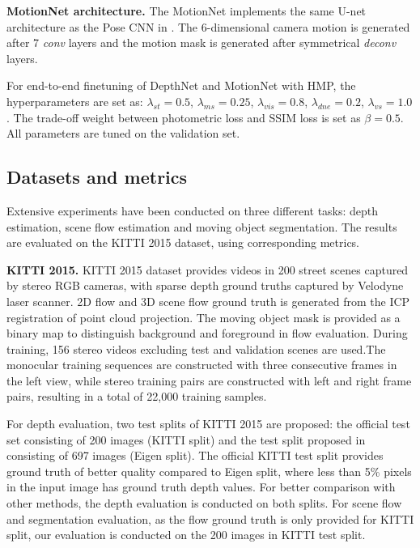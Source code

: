 \documentclass[runningheads]{llncs}
\begin{document}
\vspace{0.5\baselineskip}
\noindent\textbf{MotionNet architecture.}
The MotionNet implements the same U-net \cite{ronneberger2015u} architecture as the Pose CNN in \cite{zhou2017unsupervised}. The 6-dimensional camera motion is generated after 7 \textit{conv} layers and the motion mask is generated after symmetrical \textit{deconv} layers.

For end-to-end finetuning of DepthNet and MotionNet with HMP, the hyperparameters are set as: $\lambda_{st} = 0.5$, $\lambda_{ms} = 0.25$, $\lambda_{vis} = 0.8$, $\lambda_{dne} = 0.2$, $\lambda_{vs} = 1.0$. The trade-off weight between photometric loss and SSIM loss is set as $\beta=0.5$. All parameters are tuned on the validation set.


\vspace{-0.3\baselineskip}
\subsection{Datasets and metrics}
\vspace{-0.3\baselineskip}

Extensive experiments have been conducted on three different tasks: depth estimation, scene flow estimation and moving object segmentation. The results are evaluated on the KITTI 2015 dataset, using corresponding metrics.

\vspace{0.5\baselineskip}
\noindent\textbf{KITTI 2015.}
KITTI 2015 dataset provides videos in 200 street scenes captured by stereo RGB cameras, with sparse depth ground truths captured by Velodyne laser scanner. 2D flow and 3D scene flow ground truth is generated from the ICP registration of point cloud projection. The moving object mask is provided as a binary map to distinguish background and foreground in flow evaluation. During training, 156 stereo videos excluding test and validation scenes are used.The monocular training sequences are constructed with three consecutive frames in the left view, while stereo training pairs are constructed with left and right frame pairs, resulting in a total of 22,000 training samples. 

For depth evaluation, two test splits of KITTI 2015 are proposed: the official test set consisting of 200 images (KITTI split) and the test split proposed in \cite{eigen2014depth} consisting of 697 images (Eigen split). The official KITTI test split provides ground truth of better quality compared to Eigen split, where less than 5\% pixels in the input image has ground truth depth values. For better comparison with other methods, the depth evaluation is conducted on both splits. For scene flow and segmentation evaluation, as the flow ground truth is only provided for KITTI split, our evaluation is conducted on the 200 images in KITTI test split.
\end{document}
